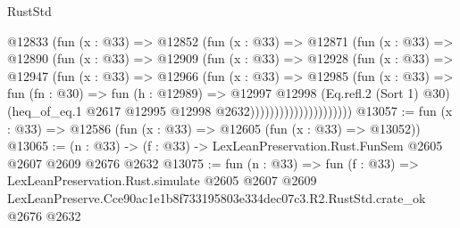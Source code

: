 \begin{lexlean}{RustStd}
\begin{coremodule}
                        @12833
                          (fun (x : @33) =>
                          @12852
                            (fun (x : @33) =>
                            @12871
                              (fun (x : @33) =>
                              @12890
                                (fun (x : @33) =>
                                @12909
                                  (fun (x : @33) =>
                                  @12928
                                    (fun (x : @33) =>
                                    @12947
                                      (fun (x : @33) =>
                                      @12966
                                        (fun (x : @33) =>
                                        @12985
                                          (fun (x : @33) =>
                                          fun (fn : @30) =>
                                          fun (h : @12989) =>
                                          @12997
                                            @12998
                                            (Eq.refl.{2} (Sort 1) @30)
                                            (heq_of_eq.{1}
                                              @2617
                                              @12995
                                              @12998
                                              @2632)))))))))))))))))))))
@13057 := fun (x : @33) => @12586 (fun (x : @33) => @12605 (fun (x : @33) => @13052))
@13065 := (n : @33) -> (f : @33) -> LexLeanPreservation.Rust.FunSem @2605 @2607 @2609 @2676 @2632
@13075 := fun (n : @33) =>
  fun (f : @33) =>
  LexLeanPreservation.Rust.simulate
    @2605
    @2607
    @2609
    LexLeanPreserve.Cce90ac1e1b8f733195803e334dec07c3.R2.RustStd.crate_ok
    @2676
    @2632
\end{coremodule}
\end{lexlean}
